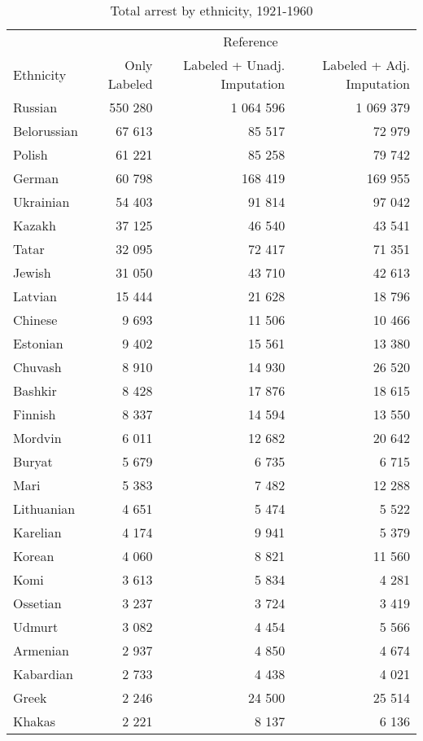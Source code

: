 \begin{table}[t]

\caption{\label{tab:total_arrests_by_ethnicity}Total arrest by ethnicity, 1921-1960}
\centering
\fontsize{8}{10}\selectfont
\begin{tabular}{lrrr}
\toprule
\multicolumn{1}{c}{ } & \multicolumn{3}{c}{Reference} \\
\cmidrule(l{2pt}r{2pt}){2-4}
Ethnicity & Only Labeled & Labeled + Unadj. Imputation & Labeled + Adj. Imputation\\
\midrule
Russian & 550 280 & 1 064 596 & 1 069 379\\
Belorussian & 67 613 & 85 517 & 72 979\\
Polish & 61 221 & 85 258 & 79 742\\
German & 60 798 & 168 419 & 169 955\\
Ukrainian & 54 403 & 91 814 & 97 042\\
Kazakh & 37 125 & 46 540 & 43 541\\
Tatar & 32 095 & 72 417 & 71 351\\
Jewish & 31 050 & 43 710 & 42 613\\
Latvian & 15 444 & 21 628 & 18 796\\
Chinese & 9 693 & 11 506 & 10 466\\
Estonian & 9 402 & 15 561 & 13 380\\
Chuvash & 8 910 & 14 930 & 26 520\\
Bashkir & 8 428 & 17 876 & 18 615\\
Finnish & 8 337 & 14 594 & 13 550\\
Mordvin & 6 011 & 12 682 & 20 642\\
Buryat & 5 679 & 6 735 & 6 715\\
Mari & 5 383 & 7 482 & 12 288\\
Lithuanian & 4 651 & 5 474 & 5 522\\
Karelian & 4 174 & 9 941 & 5 379\\
Korean & 4 060 & 8 821 & 11 560\\
Komi & 3 613 & 5 834 & 4 281\\
Ossetian & 3 237 & 3 724 & 3 419\\
Udmurt & 3 082 & 4 454 & 5 566\\
Armenian & 2 937 & 4 850 & 4 674\\
Kabardian & 2 733 & 4 438 & 4 021\\
Greek & 2 246 & 24 500 & 25 514\\
Khakas & 2 221 & 8 137 & 6 136\\

\end{tabular}
\end{table}
